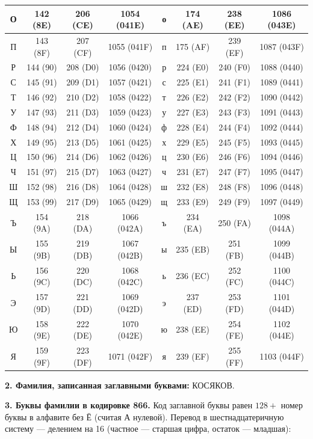\documentclass[a4paper, 12pt]{article}
\begin{document}
{\begin{longtable}{|c|c|c|c||c|c|c|c|}
О & 142 (8E) & 206 (CE) & 1054 (041E) & о & 174 (AE) & 238 (EE) & 1086 (043E) \\ \hline
П & 143 (8F) & 207 (CF) & 1055 (041F) & п & 175 (AF) & 239 (EF) & 1087 (043F) \\ \hline
Р & 144 (90) & 208 (D0) & 1056 (0420) & р & 224 (E0) & 240 (F0) & 1088 (0440) \\ \hline
С & 145 (91) & 209 (D1) & 1057 (0421) & с & 225 (E1) & 241 (F1) & 1089 (0441) \\ \hline
Т & 146 (92) & 210 (D2) & 1058 (0422) & т & 226 (E2) & 242 (F2) & 1090 (0442) \\ \hline
У & 147 (93) & 211 (D3) & 1059 (0423) & у & 227 (E3) & 243 (F3) & 1091 (0443) \\ \hline
Ф & 148 (94) & 212 (D4) & 1060 (0424) & ф & 228 (E4) & 244 (F4) & 1092 (0444) \\ \hline
Х & 149 (95) & 213 (D5) & 1061 (0425) & х & 229 (E5) & 245 (F5) & 1093 (0445) \\ \hline
Ц & 150 (96) & 214 (D6) & 1062 (0426) & ц & 230 (E6) & 246 (F6) & 1094 (0446) \\ \hline
Ч & 151 (97) & 215 (D7) & 1063 (0427) & ч & 231 (E7) & 247 (F7) & 1095 (0447) \\ \hline
Ш & 152 (98) & 216 (D8) & 1064 (0428) & ш & 232 (E8) & 248 (F8) & 1096 (0448) \\ \hline
Щ & 153 (99) & 217 (D9) & 1065 (0429) & щ & 233 (E9) & 249 (F9) & 1097 (0449) \\ \hline
Ъ & 154 (9A) & 218 (DA) & 1066 (042A) & ъ & 234 (EA) & 250 (FA) & 1098 (044A) \\ \hline
Ы & 155 (9B) & 219 (DB) & 1067 (042B) & ы & 235 (EB) & 251 (FB) & 1099 (044B) \\ \hline
Ь & 156 (9C) & 220 (DC) & 1068 (042C) & ь & 236 (EC) & 252 (FC) & 1100 (044C) \\ \hline
Э & 157 (9D) & 221 (DD) & 1069 (042D) & э & 237 (ED) & 253 (FD) & 1101 (044D) \\ \hline
Ю & 158 (9E) & 222 (DE) & 1070 (042E) & ю & 238 (EE) & 254 (FE) & 1102 (044E) \\ \hline
Я & 159 (9F) & 223 (DF) & 1071 (042F) & я & 239 (EF) & 255 (FF) & 1103 (044F) \\ \hline
\end{longtable}
}

\textbf{2. Фамилия, записанная заглавными буквами:} КОСЯКОВ.

\textbf{3. Буквы фамилии в кодировке 866.} Код заглавной буквы равен $128 + $ номер буквы в алфавите без Ё
(считая А нулевой). Перевод в шестнадцатеричную систему --- делением на 16
(частное --- старшая цифра, остаток --- младшая):
\end{document}

